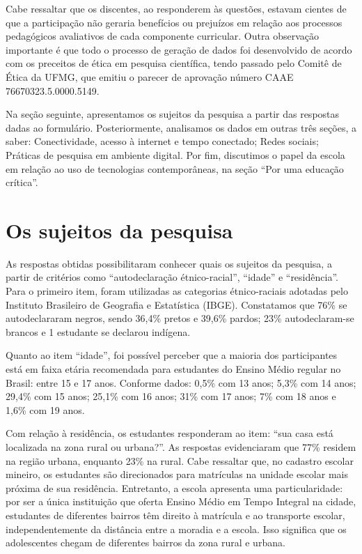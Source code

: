 \documentclass[portuguese]{textolivre}
\begin{document}
Cabe ressaltar que os discentes, ao responderem às questões, estavam cientes de que a participação não geraria benefícios ou prejuízos em relação aos processos pedagógicos avaliativos de cada componente curricular. Outra observação importante é que todo o processo de geração de dados foi desenvolvido de acordo com os preceitos de ética em pesquisa científica, tendo passado pelo Comitê de Ética da UFMG, que emitiu o parecer de aprovação número CAAE 76670323.5.0000.5149.

Na seção seguinte, apresentamos os sujeitos da pesquisa a partir das respostas dadas ao formulário. Posteriormente, analisamos os dados em outras três seções, a saber: Conectividade, acesso à internet e tempo conectado; Redes sociais; Práticas de pesquisa em ambiente digital. Por fim, discutimos o papel da escola em relação ao uso de tecnologias contemporâneas, na seção ``Por uma educação crítica''.


\section{Os sujeitos da pesquisa}\label{sec-conduta}
As respostas obtidas possibilitaram conhecer quais os sujeitos da pesquisa, a partir de critérios como ``autodeclaração étnico-racial'', ``idade'' e ``residência''. Para o primeiro item, foram utilizadas as categorias étnico-raciais adotadas pelo Instituto Brasileiro de Geografia e Estatística (IBGE). Constatamos que 76\% se autodeclararam negros, sendo 36,4\% pretos e 39,6\% pardos; 23\% autodeclaram-se brancos e 1 estudante se declarou indígena. 

Quanto ao item ``idade'', foi possível perceber que a maioria dos participantes está em faixa etária recomendada para estudantes do Ensino Médio regular no Brasil: entre 15 e 17 anos. Conforme dados: 0,5\% com 13 anos; 5,3\% com 14 anos; 29,4\% com 15 anos; 25,1\% com 16 anos; 31\% com 17 anos; 7\% com 18 anos e 1,6\% com 19 anos.

Com relação à residência, os estudantes responderam ao item: ``sua casa está localizada na zona rural ou urbana?''. As respostas evidenciaram que 77\% residem na região urbana, enquanto 23\% na rural. Cabe ressaltar que, no cadastro escolar mineiro, os estudantes são direcionados para matrículas na unidade escolar mais próxima de sua residência. Entretanto, a escola apresenta uma particularidade: por ser a única instituição que oferta Ensino Médio em Tempo Integral na cidade, estudantes de diferentes bairros têm direito à matrícula e ao transporte escolar, independentemente da distância entre a moradia e a escola. Isso significa que os adolescentes chegam de diferentes bairros da zona rural e urbana.
\end{document}
